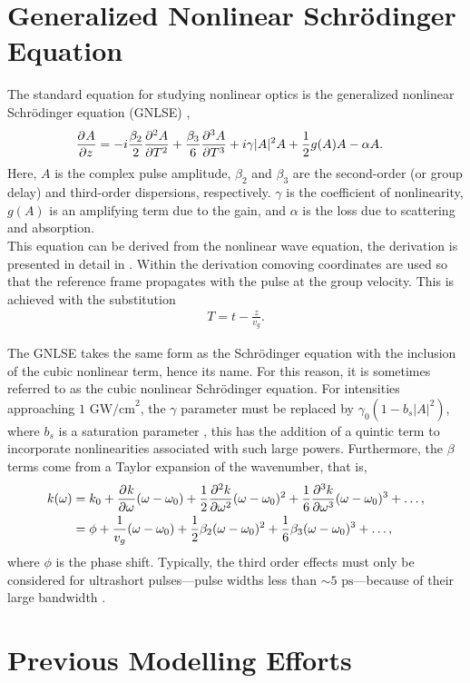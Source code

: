 \section{Generalized Nonlinear Schr\"odinger Equation}
The standard equation for studying nonlinear optics is the generalized nonlinear Schr\"odinger equation (GNLSE) \cite{agrawal2013, burgoyne2007, ferreira, peng, shtyrina, yarutkina},
\begin{align}
\label{eq:nlse}
\pdiff{A}{z} &= - i \frac{\beta_2}{2}\pdiff[2]{A}{T} + \frac{\beta_3}{6}\pdiff[3]{A}{T} + i \gamma |A|^2 A + \frac{1}{2}g(A) A - \alpha A.
\end{align}
Here, $A$ is the complex pulse amplitude, $\beta_2$ and $\beta_3$ are the second-order (or group delay) and third-order dispersions, respectively. $\gamma$ is the coefficient of nonlinearity, $g(A)$ is an amplifying term due to the gain, and $\alpha$ is the loss due to scattering and absorption. \\

This equation can be derived from the nonlinear wave equation, the derivation is presented in detail in \cite{agrawal2013, ferreira}. Within the derivation comoving coordinates are used so that the reference frame propagates with the pulse at the group velocity. This is achieved with the substitution
\begin{align*}
T = t - \frac{z}{v_g}.
\end{align*}

The GNLSE takes the same form as the Schr\"odinger equation with the inclusion of the cubic nonlinear term, hence its name. For this reason, it is sometimes referred to as the cubic nonlinear Schr\"odinger equation. For intensities approaching $1 \text{ GW/cm}^2$, the $\gamma$ parameter must be replaced by $\gamma_0 (1 - b_s |A|^2)$, where $b_s$ is a saturation parameter \cite{agrawal2013}, this has the addition of a quintic term to incorporate nonlinearities associated with such large powers. Furthermore, the $\beta$ terms come from a Taylor expansion of the wavenumber, that is,
\begin{align*}
k(\omega) &= k_0 + \pdiff{k}{\omega}(\omega - \omega_0) + \frac{1}{2} \pdiff[2]{k}{\omega}(\omega - \omega_0)^2 + \frac{1}{6} \pdiff[3]{k}{\omega}(\omega - \omega_0)^3 + \dots, \\
&= \phi + \frac{1}{v_g}(\omega - \omega_0) + \frac{1}{2}\beta_2 (\omega - \omega_0)^2 + \frac{1}{6}\beta_3 (\omega - \omega_0)^3 + \dots,
\end{align*}
where $\phi$ is the phase shift. Typically, the third order effects must only be considered for ultrashort pulses---pulse widths less than $\sim5 \text{ ps}$---because of their large bandwidth \cite{agrawal2013}.

\section{Previous Modelling Efforts}

